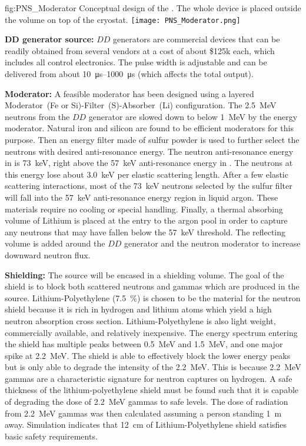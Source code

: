 \begin{dunefigure}{fig:PNS_Moderator}
{Conceptual design of the . The whole device is placed outside the  volume on top of the cryostat.}
\texttt{[image: PNS\_Moderator.png]}
\end{dunefigure}



{\bf DD generator source:} $DD$ generators are commercial devices that can be readily obtained from several vendors at a cost of about \$\num{125}k each, which includes all control electronics. The pulse width is adjustable and can be delivered from about \SIrange{10}{1000}{\micro\s} (which affects the total output). 

{\bf Moderator:}  A feasible moderator has been designed using a layered Moderator~(Fe or Si)-Filter~(S)-Absorber~(Li) %
configuration. The \SI{2.5}{\MeV} neutrons from the $DD$ generator are slowed down to below \SI{1}{\MeV} by the energy moderator. Natural iron and silicon are found to be efficient moderators for this purpose. Then an energy filter made of sulfur powder is used to further select the neutrons with desired anti-resonance energy.
The neutron anti-resonance energy in  is \SI{73}{\keV}, right above the \SI{57}{\keV} anti-resonance energy in . The neutrons at this energy lose about \SI{3.0}{\keV} per elastic scattering length. After a few elastic scattering interactions, most of the \SI{73}{\keV} neutrons selected by the sulfur filter will fall into the \SI{57}{\keV} anti-resonance energy region in liquid argon. These materials require no cooling or special handling. Finally, a thermal absorbing volume of Lithium is placed at the entry to the argon pool in order to capture any neutrons that may have fallen below the \SI{57}{\keV} threshold. The reflecting volume is added around the $DD$ generator and the neutron moderator to increase downward neutron flux. 

{\bf Shielding:} The source will be encased in a shielding volume. The goal of the shield is to block both scattered neutrons and gammas which are produced in the source. Lithium-Polyethylene (\SI{7.5}{\%}) is chosen to be the material for the neutron shield because it is rich in hydrogen and lithium atoms which yield a high neutron absorption cross section. Lithium-Polyethylene is also light weight, commercially available, and relatively inexpensive. The energy spectrum entering the shield has multiple peaks between \SI{0.5}{\MeV} and \SI{1.5}{\MeV}, and one major spike at \SI{2.2}{\MeV}. The shield is able to effectively block the lower energy peaks but is only able to degrade the intensity of the \SI{2.2}{\MeV}. This is because \SI{2.2}{\MeV} gammas are a characteristic signature for neutron captures on hydrogen. A safe thickness of the lithium-polyethylene shield must be found such that it is capable of degrading the dose of \SI{2.2}{\MeV} gammas to safe levels. The dose of radiation from \SI{2.2}{\MeV} gammas was then calculated assuming a person standing \SI{1}{\m} away. Simulation indicates that \SI{12}{\cm} of Lithium-Polyethylene shield satisfies basic safety requirements. 


